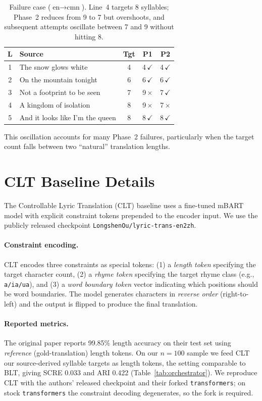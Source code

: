 \documentclass[11pt]{article}
\begin{document}
\begin{table}[h]
\centering
\small
\begin{tabular}{@{}clccc@{}}
\toprule
\textbf{L} & \textbf{Source} & \textbf{Tgt} & \textbf{P1} & \textbf{P2} \\
\midrule
1 & The snow glows white & 4 & 4\,$\checkmark$ & 4\,$\checkmark$ \\
2 & On the mountain tonight & 6 & 6\,$\checkmark$ & 6\,$\checkmark$ \\
3 & Not a footprint to be seen & 7 & 9\,$\times$ & 7\,$\checkmark$ \\
4 & A kingdom of isolation & 8 & 9\,$\times$ & 7\,$\times$ \\
5 & And it looks like I'm the queen & 8 & 8\,$\checkmark$ & 8\,$\checkmark$ \\
\bottomrule
\end{tabular}
\caption{Failure case ($\text{en} \rightarrow \text{cmn}$). Line~4 targets 8 syllables; Phase~2 reduces from 9 to 7 but overshoots, and subsequent attempts oscillate between 7 and 9 without hitting 8.}
\label{tab:ex-failure}
\end{table}

This oscillation accounts for many Phase~2 failures, particularly when the target count falls between two ``natural'' translation lengths.

\section{CLT Baseline Details}
\label{app:clt}

The Controllable Lyric Translation (CLT) baseline \citep{ou-etal-2023-songs} uses a fine-tuned mBART model with explicit constraint tokens prepended to the encoder input.
We use the publicly released checkpoint \texttt{LongshenOu/lyric-trans-en2zh}.

\paragraph{Constraint encoding.}
CLT encodes three constraints as special tokens: (1) a \emph{length token} specifying the target character count, (2) a \emph{rhyme token} specifying the target rhyme class (e.g., \texttt{a/ia/ua}), and (3) a \emph{word boundary token} vector indicating which positions should be word boundaries.
The model generates characters in \emph{reverse order} (right-to-left) and the output is flipped to produce the final translation.

\paragraph{Reported metrics.}
The original paper reports 99.85\% length accuracy on their test set using \emph{reference} (gold-translation) length tokens.
On our $n{=}100$ sample we feed CLT our source-derived syllable targets as length tokens, the setting comparable to BLT, giving SCRE 0.033 and ARI 0.422 (Table~\ref{tab:orchestrator}).
We reproduce CLT with the authors' released checkpoint and their forked \texttt{transformers}; on stock \texttt{transformers} the constraint decoding degenerates, so the fork is required.
\end{document}
